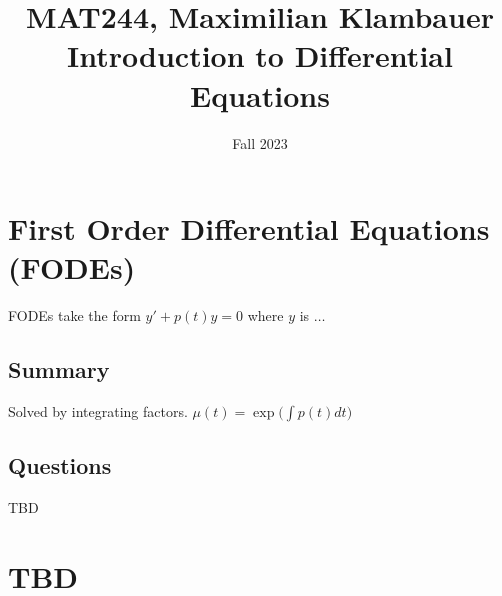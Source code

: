 \documentclass{article}
\title{MAT244, Maximilian Klambauer\\Introduction to Differential Equations }
\author{}
\date{Fall 2023}
\begin{document}
\maketitle


\tableofcontents

\pagebreak 

\section{First Order Differential Equations (FODEs)} 

FODEs take the form $y' + p(t)y = 0$ where $y$ is $\dots$

\subsection{Summary}
Solved by integrating factors. $\mu(t)=\exp\big(\int p(t) dt\big)$ 

\subsection{Questions}
TBD

\section{TBD}
\end{document}
